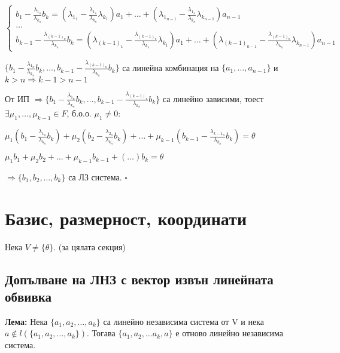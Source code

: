 \documentclass[fleqn,12pt]{article}
\begin{document}
\begin{flushleft}
\begin{equation}
    \begin{cases}
        b_1 - \frac{\lambda_{1_n}}{\lambda_{k_n}} b_k = (\lambda_{1_1} - \frac{\lambda_{1_n}}{\lambda_{k_n}} \lambda_{k_1}) a_1 + \dots + (\lambda_{1_{n-1}} - \frac{\lambda_{1_n}}{\lambda_{k_n}} \lambda_{k_{n-1}}) a_{n-1}\\
        \dots\\
        b_{k-1} - \frac{\lambda_{{(k-1)}_n}}{\lambda_{k_n}} b_k = (\lambda_{{(k-1)}_1} - \frac{\lambda_{{(k-1)}_n}}{\lambda_{k_n}} \lambda_{k_1}) a_1 + \dots + (\lambda_{{(k-1)}_{n-1}} - \frac{\lambda_{{(k-1)}_n}}{\lambda_{k_n}} \lambda_{k_{n-1}}) a_{n-1}
    \end{cases}
\end{equation}

$ \{b_1 - \frac{\lambda_{1_n}}{\lambda_{k_n}} b_k, \dots, b_{k-1} - \frac{\lambda_{{(k-1)}_n}}{\lambda_{k_n}} b_k\} $ са линейна комбинация на $ \{a_1, \dots, a_{n-1} \} $ и $ k > n \Rightarrow k-1 > n - 1$

\vspace{5mm}

От ИП $ \Rightarrow \{ b_1 - \frac{\lambda_{1_n}}{\lambda_{k_n}} b_k, \dots, b_{k-1} - \frac{\lambda_{{(k-1)}_n}}{\lambda_{k_n}} b_k\} $ са линейно зависими, тоест $ \exists \mu_1, \dots, \mu_{k-1} \in F$, б.о.о. $\mu_1 \neq 0 $:

\vspace{5mm}

$ \mu_1 (b_1 - \frac{\lambda_{1_n}}{\lambda_{k_n}} b_k) + \mu_2 (b_2 - \frac{\lambda_{2_n}}{\lambda_{k_n}} b_k) + \dots + \mu_{k-1} (b_{k-1} - \frac{\lambda_{{k-1}_n}}{\lambda_{k_n}} b_k) = \theta$

$ \mu_1 b_1 + \mu_2 b_2 + \dots + \mu_{k-1} b_{k-1} + (\dots) b_k = \theta $

$ \Rightarrow \{ b_1, b_2, \dots, b_k \} $ са ЛЗ система. $\square$


\section{Базис, размерност, координати}
Нека $ V \neq \{ \theta \} $. (за цялата секция)

\subsection{Допълване на ЛНЗ с вектор извън линейната обвивка}
\textbf{Лема:} Нека $\{a_1, a_2, \dots, a_k\}$ са линейно независима система от V и нека $ a \notin l(\{ a_1, a_2, \dots, a_k\}) $. Тогава $ \{a_1, a_2, \dots a_k, a \} $ е отново линейно независима система.


\end{flushleft}
\end{document}
